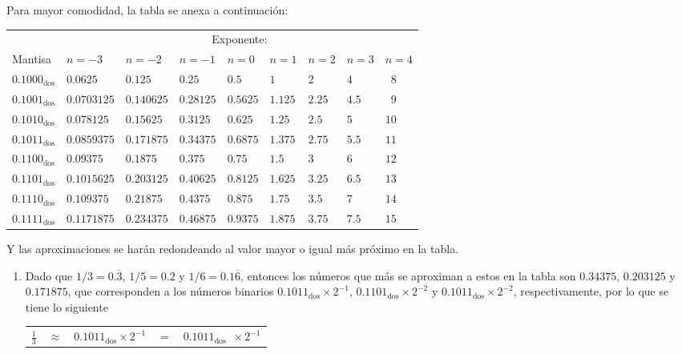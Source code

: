 \begin{solucion}
 Para mayor comodidad, la tabla se anexa a continuaci\'on:
 \begin{center}
  \begin{tabular}{l|l|l|l|l|l|l|l|l}
   \hline 
    & \multicolumn{8}{c}{Exponente:} \\
   \cline{2-9}
   Mantisa & $n=-3$ & $n=-2$ & $n=-1$ & $n=0$ & $n=1$ & $n=2$ & $n=3$ & $n=4$ \\
   \hline 
   $0.1000_{\text{dos}}$ & $0.0625$ & $0.125$ & $0.25$ & $0.5$ & $1$ & $2$ & $4$ & $\phantom{1}8$ \\
   $0.1001_{\text{dos}}$ & $0.0703125$ & $0.140625$ & $0.28125$ & $0.5625$ & $1.125$ & $2.25$ & $4.5$ & $\phantom{1}9$ \\ 
   $0.1010_{\text{dos}}$ & $0.078125$ & $0.15625$ & $0.3125$ & $0.625$ & $1.25$ & $2.5$ & $5$ & $10$ \\
   $0.1011_{\text{dos}}$ & $0.0859375$ & $0.171875$ & $0.34375$ & $0.6875$ & $1.375$ & $2.75$ & $5.5$ & $11$ \\
   $0.1100_{\text{dos}}$ & $0.09375$ & $0.1875$ & $0.375$ & $0.75$ & $1.5$ & $3$ & $6$ & $12$ \\
   $0.1101_{\text{dos}}$ & $0.1015625$ & $0.203125$ & $0.40625$ & $0.8125$ & $1.625$ & $3.25$ & $6.5$ & $13$ \\
   $0.1110_{\text{dos}}$ & $0.109375$ & $0.21875$ & $0.4375$ & $0.875$ & $1.75$ & $3.5$ & $7$ & $14$ \\ 
   $0.1111_{\text{dos}}$ & $0.1171875$ & $0.234375$ & $0.46875$ & $0.9375$ & $1.875$ & $3.75$ & $7.5$ & $15$ \\
   \hline 
  \end{tabular}
 \end{center}
 Y las aproximaciones se har\'an redondeando al valor mayor o igual m\'as pr\'oximo en la tabla.
 \begin{enumerate}
  \item Dado que $1/3 = 0.\overline{3}$, $1/5 = 0.2$ y $1/6 = 0.1\overline{6}$, entonces los n\'umeros que m\'as se aproximan a estos en la tabla son $0.34375$, $0.203125$ y $0.171875$, que corresponden a los n\'umeros binarios $0.1011_{\text{dos}}\times 2^{-1}$, $0.1101_{\text{dos}}\times 2^{-2}$ y $0.1011_{\text{dos}}\times 2^{-2}$, respectivamente, por lo que se tiene lo siguiente
  \begin{center}
   \begin{tabular}{ccccc}
    $\frac{1}{3}$ & $\approx$ & $0.1011_{\text{dos}}\times 2^{-1}$ & $=$ & $0.1011_{\text{dos}}\phantom{0} \times 2^{-1}$ \\ 

\end{tabular}
\end{center}
\end{enumerate}
\end{solucion}
